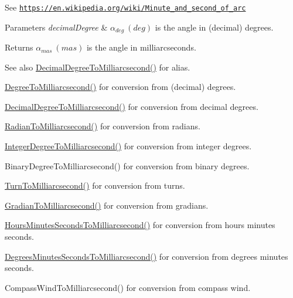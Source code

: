 See \href{https://en.wikipedia.org/wiki/Minute_and_second_of_arc}{\tt https\+://en.\+wikipedia.\+org/wiki/\+Minute\+\_\+and\+\_\+second\+\_\+of\+\_\+arc} 
\begin{DoxyParams}{Parameters}
{\em decimal\+Degree} & $\alpha_{deg}\ (deg)$ is the angle in (decimal) degrees. \\
\hline
\end{DoxyParams}
\begin{DoxyReturn}{Returns}
$\alpha_{mas}\ (mas)$ is the angle in milliarcseconds. 
\end{DoxyReturn}
\begin{DoxySeeAlso}{See also}
\mbox{\hyperlink{group___e_g_x_math-_conversions-_angle_conversions-_decimal_degree_gadb9ff3c92cf7484793f91e7de80c222e}{Decimal\+Degree\+To\+Milliarcsecond()}} for alias. 

\mbox{\hyperlink{group___e_g_x_math-_conversions-_angle_conversions-_degree_ga2c218e286b2ef72a00734dbc5a7f5ab6}{Degree\+To\+Milliarcsecond()}} for conversion from (decimal) degrees. 

\mbox{\hyperlink{group___e_g_x_math-_conversions-_angle_conversions-_decimal_degree_gadb9ff3c92cf7484793f91e7de80c222e}{Decimal\+Degree\+To\+Milliarcsecond()}} for conversion from decimal degrees. 

\mbox{\hyperlink{group___e_g_x_math-_conversions-_angle_conversions-_radian_ga84fbb494a455cfeb30be62776f96c9a9}{Radian\+To\+Milliarcsecond()}} for conversion from radians. 

\mbox{\hyperlink{group___e_g_x_math-_conversions-_angle_conversions-_integer_degree_gadc43f22e832cd8fcf16b7bd2269ae348}{Integer\+Degree\+To\+Milliarcsecond()}} for conversion from integer degrees. 

Binary\+Degree\+To\+Milliarcsecond() for conversion from binary degrees. 

\mbox{\hyperlink{group___e_g_x_math-_conversions-_angle_conversions-_turn_ga05d6fea8f8475831e93dd23f6196393f}{Turn\+To\+Milliarcsecond()}} for conversion from turns. 

\mbox{\hyperlink{group___e_g_x_math-_conversions-_angle_conversions-_gradian_gad77ea0956413029f4166dce8d7f5ce83}{Gradian\+To\+Milliarcsecond()}} for conversion from gradians. 

\mbox{\hyperlink{group___e_g_x_math-_conversions-_angle_conversions-_hours_minutes_seconds_gaf63c3ba5f75aacd268db2814575fa3f9}{Hours\+Minutes\+Seconds\+To\+Milliarcsecond()}} for conversion from hours minutes seconds. 

\mbox{\hyperlink{group___e_g_x_math-_conversions-_angle_conversions-_degrees_minutes_seconds_gafc5f994dfc7cc26500ca978336484926}{Degrees\+Minutes\+Seconds\+To\+Milliarcsecond()}} for conversion from degrees minutes seconds. 

Compass\+Wind\+To\+Milliarcsecond() for conversion from compass wind. 
\end{DoxySeeAlso}
\mbox{\label{group___e_g_x_math-_conversions-_angle_conversions-_degree_gae4fa6c2d3805430760783650cfbfdb11}} 
